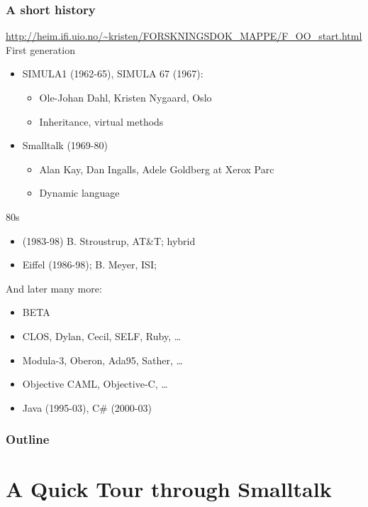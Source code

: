 \documentclass{beamer}
\begin{document}
\begin{frame}[fragile]
\frametitle{A short history}
\url{http://heim.ifi.uio.no/~kristen/FORSKNINGSDOK_MAPPE/F_OO_start.html}
First generation
\begin{itemize}
\item SIMULA1 (1962-65), SIMULA 67 (1967): 
\begin{itemize}
\item Ole-Johan Dahl, Kristen Nygaard, Oslo
\item Inheritance, virtual methods
\end{itemize}
\item Smalltalk (1969-80) 
\begin{itemize}
\item Alan Kay, Dan Ingalls, Adele Goldberg at Xerox Parc
\item Dynamic language %
\end{itemize}
\end{itemize}

80s
\begin{itemize}
\item \cpp(1983-98)
B. Stroustrup, AT\&T; hybrid
\item Eiffel (1986-98); B. Meyer, ISI; %

\end{itemize}

And later many more:
\begin{itemize}
\item BETA
\item CLOS, Dylan, Cecil, SELF, Ruby, \ldots
\item  Modula-3, Oberon, Ada95, Sather, \ldots
\item Objective CAML, Objective-C, \ldots
\item Java (1995-03),
C\# (2000-03)


\end{itemize}

\end{frame}




\begin{frame}
  \frametitle{Outline}
  \tableofcontents
\end{frame}

\section{A Quick Tour through Smalltalk}
\end{document}
